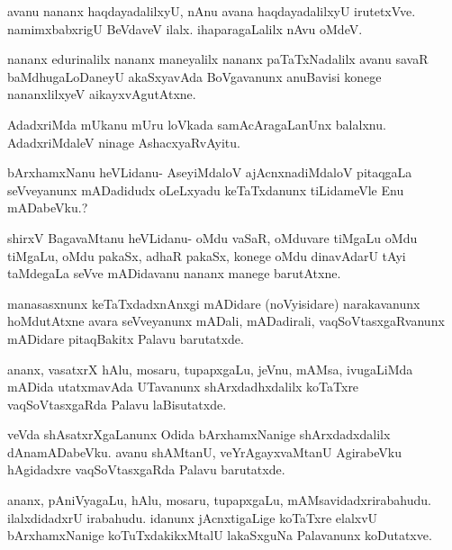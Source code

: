 \documentclass{article}
\begin{document}
\begin{mng}%
avanu nananx haqdayadalilxyU, nAnu avana haqdayadalilxyU
irutetxVve. namimxbabxrigU BeVdaveV ilalx. ihaparagaLalilx nAvu oMdeV.
\end{mng}

\begin{mng}%
nananx edurinalilx nananx maneyalilx nananx paTaTxNadalilx avanu savaR
baMdhugaLoDaneyU akaSxyavAda BoVgavanunx anuBavisi konege nananxlilxyeV
aikayxvAgutAtxne.
\end{mng}

\begin{mng}%
AdadxriMda mUkanu mUru loVkada samAcAragaLanUnx
balalxnu. AdadxriMdaleV ninage AshacxyaRvAyitu.
\end{mng}

\begin{mng}%
bArxhamxNanu heVLidanu- AseyiMdaloV ajAcnxnadiMdaloV
pitaqgaLa seVveyanunx mADadidudx oLeLxyadu keTaTxdanunx tiLidameVle Enu
mADabeVku.?
\end{mng}

\begin{mng}%
shirxV BagavaMtanu heVLidanu- oMdu vaSaR, oMduvare tiMgaLu
oMdu tiMgaLu, oMdu pakaSx, adhaR pakaSx, konege oMdu dinavAdarU tAyi
taMdegaLa seVve mADidavanu nananx manege barutAtxne.
\end{mng}

\begin{mng}%
manasasxnunx keTaTxdadxnAnxgi mADidare (noVyisidare) narakavanunx
hoMdutAtxne avara seVveyanunx mADali, mADadirali, vaqSoVtasxgaRvanunx
mADidare pitaqBakitx Palavu barutatxde.
\end{mng}

\begin{mng}%
ananx, vasatxrX hAlu, mosaru, tupapxgaLu, jeVnu, mAMsa,
ivugaLiMda mADida utatxmavAda UTavanunx shArxdadhxdalilx koTaTxre vaqSoVtasxgaRda
Palavu laBisutatxde.
\end{mng}

\begin{mng}%
veVda shAsatxrXgaLanunx Odida bArxhamxNanige shArxdadxdalilx dAnamADabeVku.
avanu shAMtanU, veYrAgayxvaMtanU AgirabeVku hAgidadxre vaqSoVtasxgaRda
Palavu barutatxde.
\end{mng}

\begin{mng}%
ananx, pAniVyagaLu, hAlu, mosaru, tupapxgaLu, mAMsavidadxrirabahudu.
ilalxdidadxrU irabahudu. idanunx jAcnxtigaLige koTaTxre
elalxvU bArxhamxNanige koTuTxdakikxMtalU lakaSxguNa Palavanunx koDutatxve.
\end{mng}
\end{document}
